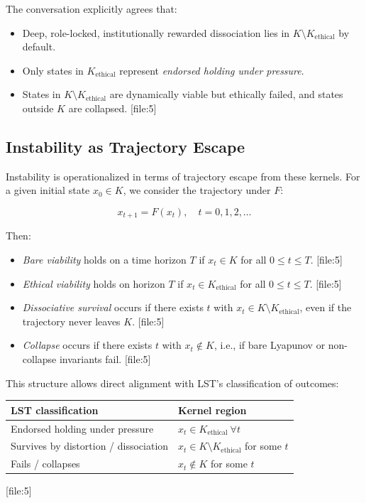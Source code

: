 \documentclass[11pt]{article}
\begin{document}
The conversation explicitly agrees that:

\begin{itemize}[leftmargin=*]
  \item Deep, role-locked, institutionally rewarded dissociation lies in \(K\setminus K_{\text{ethical}}\) by default.
  \item Only states in \(K_{\text{ethical}}\) represent \emph{endorsed holding under pressure}.
  \item States in \(K\setminus K_{\text{ethical}}\) are dynamically viable but ethically failed, and states outside \(K\) are collapsed. [file:5]
\end{itemize}

\subsection{Instability as Trajectory Escape}

Instability is operationalized in terms of trajectory escape from these kernels. For a given initial state \(x_0\in K\), we consider the trajectory under \(F\):

\[
  x_{t+1} = F(x_t),\quad t=0,1,2,\dotsc
\]

Then:

\begin{itemize}[leftmargin=*]
  \item \emph{Bare viability} holds on a time horizon \(T\) if \(x_t\in K\) for all \(0\leq t\leq T\). [file:5]
  \item \emph{Ethical viability} holds on horizon \(T\) if \(x_t\in K_{\text{ethical}}\) for all \(0\leq t\leq T\). [file:5]
  \item \emph{Dissociative survival} occurs if there exists \(t\) with \(x_t\in K\setminus K_{\text{ethical}}\), even if the trajectory never leaves \(K\). [file:5]
  \item \emph{Collapse} occurs if there exists \(t\) with \(x_t\notin K\), i.e., if bare Lyapunov or non-collapse invariants fail. [file:5]
\end{itemize}

This structure allows direct alignment with LST's classification of outcomes:

\begin{center}
\begin{tabular}{l|l}
  LST classification & Kernel region \\
  \hline
  Endorsed holding under pressure & \(x_t\in K_{\text{ethical}}\ \forall t\) \\
  Survives by distortion / dissociation & \(x_t\in K\setminus K_{\text{ethical}}\) for some \(t\) \\
  Fails / collapses & \(x_t\notin K\) for some \(t\) \\
\end{tabular}
\end{center}
[file:5]
\end{document}

